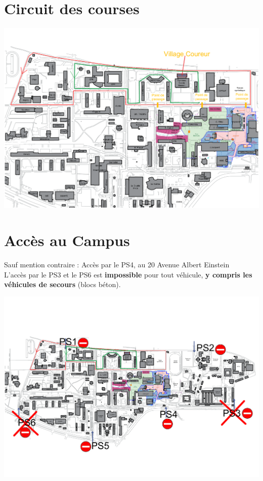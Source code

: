 \documentclass[hidelinks, paper=a4, fontsize=13pt]{report}
\begin{document}
\section{Circuit des courses}
	\begin{center}\includegraphics[width=.95\textheight, angle=90]{Exports/Plan_24h_44eme-Parcours_courses}\end{center}


\section{Accès au Campus}
Sauf mention contraire : Accès par le PS4, au 20 Avenue Albert Einstein\\
L'accès par le PS3 et le PS6 est \textbf{impossible} pour tout véhicule, \textbf{y compris les véhicules de secours} (blocs béton).
	\begin{center}\includegraphics[width=.9\textheight, angle=90]{Exports/Plan_24h_44eme-Points_Secu}\end{center}
\end{document}
